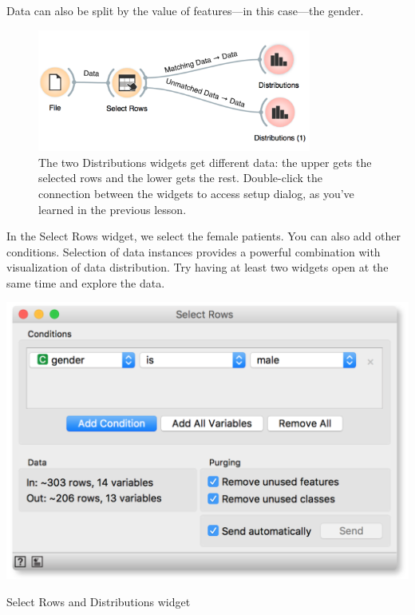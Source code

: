 \newpage
Data can also be split by the value of features—in this case—the gender.

\begin{figure}[h]
  \centering
  \includegraphics[width=90mm]{basic_data_exploration-fig3.png}%
  \caption{The two Distributions widgets get different data: the upper gets the selected rows and the lower gets the rest. Double-click the connection between the widgets to access setup dialog, as you've learned in the previous lesson.}
  \label{fig:basic_data_exploration-fig3}
\end{figure}

In the Select Rows widget, we select the female patients. You can also add other conditions. Selection of data instances provides a powerful combination with visualization of data distribution. Try having at least two widgets open at the same time and explore the data.

\begin{marginfigure}
  \includegraphics[width=\linewidth]{basic_data_exploration-fig4.png}%
  \caption{Select Rows and Distributions widget}
  \label{fig:basic_data_exploration-fig4}
\end{marginfigure}

